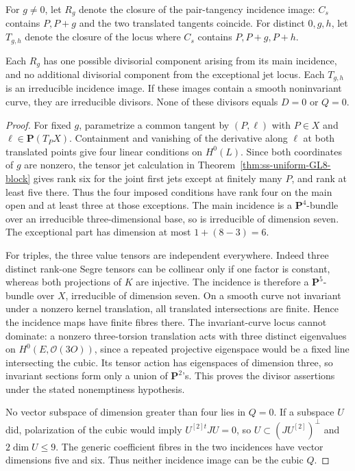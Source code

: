 For $g\ne0$, let $R_g$ denote the closure of the pair-tangency incidence
image: $C_s$ contains $P,P+g$ and the two translated tangents coincide.
For distinct $0,g,h$, let $T_{g,h}$ denote the closure of the locus
where $C_s$ contains $P,P+g,P+h$.

\begin{lemma}
\label{lem:ss-level3-collision-incidence}
Each $R_g$ has one possible divisorial component arising from its
main incidence, and no additional divisorial component from the
exceptional jet locus. Each $T_{g,h}$ is an irreducible incidence
image. If these images contain a smooth noninvariant curve, they
are irreducible divisors. None of these divisors equals $D=0$ or
$Q=0$.
\end{lemma}
\begin{proof}
For fixed $g$, parametrize a common tangent by $(P,\ell)$ with
$P\in X$ and $\ell\in\mathbf P(T_PX)$. Containment and vanishing
of the derivative along $\ell$ at both translated points give four
linear conditions on $H^0(L)$. Since both coordinates of $g$ are
nonzero, the tensor jet calculation in
Theorem~\ref{thm:ss-uniform-GL8-block} gives rank six for the joint
first jets except at finitely many $P$, and rank at least five there.
Thus the four imposed conditions have rank four on the main open
and at least three at those exceptions. The main incidence is a
$\mathbf P^4$-bundle over an irreducible three-dimensional base,
so is irreducible of dimension seven. The exceptional part has
dimension at most $1+(8-3)=6$.

For triples, the three value tensors are independent everywhere.
Indeed three distinct rank-one Segre tensors can be collinear only
if one factor is constant, whereas both projections of $K$ are
injective. The incidence is therefore a $\mathbf P^5$-bundle over
$X$, irreducible of dimension seven.
On a smooth curve not invariant under a nonzero kernel translation,
all translated intersections are finite. Hence the incidence maps
have finite fibres there. The invariant-curve locus cannot dominate:
a nonzero three-torsion translation acts with three distinct eigenvalues
on $H^0(E,\mathcal O(3O))$, since a repeated projective eigenspace
would be a fixed line intersecting the cubic. Its tensor action has
eigenspaces of dimension three, so invariant sections form only a
union of $\mathbf P^2$'s. This proves the divisor assertions under
the stated nonemptiness hypothesis.

No vector subspace of dimension greater than four lies in $Q=0$.
If a subspace $U$ did, polarization of the cubic would imply
$U^{[2]t}JU=0$, so $U\subset(JU^{[2]})^\perp$ and
$2\dim U\le9$. The generic coefficient fibres in the two incidences
have vector dimensions five and six. Thus neither incidence image
can be the cubic $Q$.


\end{proof}
